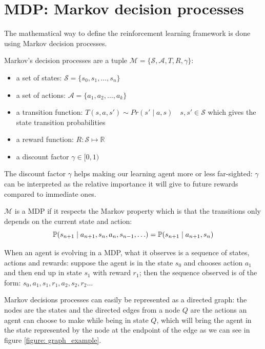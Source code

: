 \documentclass[14pt,a4paper]{article}
\theoremstyle{definition}
\begin{document}
\section{MDP: Markov decision processes} \label{def_MDP}



The mathematical way to define the reinforcement learning framework is done using Markov decision processes.

Markov's decision processes are a tuple  $\mathcal{M}=\{\mathcal{S},\mathcal{A},T,R,\gamma\}$: 

\begin{itemize}
\item a set of states: $\mathcal{S}=\{s_0,s_1,\ldots,s_n\}$
\item a set of actions: $\mathcal{A}=\{a_1,a_2,\ldots ,a_k\}$
\item a transition function:  $T(s,a,s') \sim  Pr(s'\mid a, s) \quad s,s' \in \mathcal{S}$ which gives the state transition probabilities
\item a reward function: $R:\mathcal{S}\mapsto \mathbb{R} $
\item a discount factor $\gamma \in [0,1)$
\end{itemize}


The discount factor $\gamma $ helps making our learning agent more or less far-sighted: $\gamma$ can be interpreted as the relative importance it will give to future rewards compared to immediate ones.

$\mathcal{M}$ is a MDP if it respects the Markov property which is that the transitions only depends on the current state and action: 
\begin{equation*}
\mathbb{P}(s_{n+1}\mid a_{n+1},s_{n},a_{n},s_{n-1},\ldots)=\mathbb{P}(s_{n+1}\mid a_{n+1},s_{n})\\
\end{equation*}


When an agent is evolving in a MDP, what it observes is a sequence of states, actions and rewards: suppose the agent is in the state $s_0$ and chooses action $a_1$ and then end up in state $s_1$ with reward $r_1$; then the sequence observed is of the form: $s_0,a_1,s_1,r_1,a_2,s_2,r_2\ldots$


Markov decisions processes can easily be  represented as a directed graph: the nodes are the states and the directed edges from a node $Q$ are the actions an agent can choose to make while being in state $Q$, which will bring the agent in the state represented by the node at the endpoint of the edge as we can see in figure \ref{figure: graph_example}.
\end{document}
